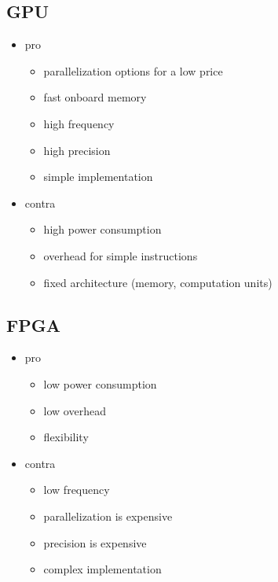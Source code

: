 \documentclass[mscthesis]{usiinfthesis}
\begin{document}
\subsection{GPU}
\begin{itemize}
    \item pro
    \begin{itemize}
        \item parallelization options for a low price
        \item fast onboard memory
        \item high frequency
        \item high precision
        \item simple implementation
    \end{itemize}
    \item contra
    \begin{itemize}
        \item high power consumption
        \item overhead for simple instructions
        \item fixed architecture (memory, computation units)
    \end{itemize}
\end{itemize}

\subsection{FPGA}
\begin{itemize}
    \item pro
    \begin{itemize}
        \item low power consumption
        \item low overhead
        \item flexibility
    \end{itemize}
    \item contra
    \begin{itemize}
        \item low frequency
        \item parallelization is expensive
        \item precision is expensive
        \item complex implementation
    \end{itemize}
\end{itemize}
\end{document}
